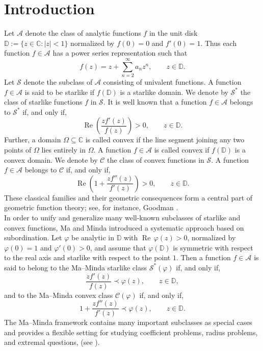 \documentclass[a4paper,12pt,reqno]{amsart} %
\numberwithin{equation}{section}
\theoremstyle{definition}
\newcounter{own}
\begin{document}
\section{Introduction}
Let $\mathcal{A}$ denote the class of analytic functions $f$ in the unit disk
$
\mathbb{D}:=\{z\in\mathbb{C}:|z|<1\}
$
normalized by
$
f(0)=0$ and  $f'(0)=1$.
Thus each function $f\in\mathcal{A}$ has a power series representation such that
\[
f(z)=z+\sum_{n=2}^{\infty}a_n z^n,
\qquad z\in\mathbb{D}.
\]
Let $\mathcal{S}$ denote the subclass of $\mathcal{A}$ consisting of univalent functions.
A function $f\in \mathcal{A}$ is said to be starlike if $f(\mathbb{D})$ is a starlike domain. We denote by $\mathcal{S}^*$ the class of starlike functions $f$ in $\mathcal{S}$. It is well known that a function $f\in \mathcal{A}$ belongs to $\mathcal{S}^*$ if, and only if,
\[
\operatorname{Re}\!\left(\frac{z f'(z)}{f(z)}\right)>0,
\qquad z\in\mathbb{D}.
\]
Further, a domain $\Omega\subseteq \mathbb{C}$ is called convex if the line segment joining any two points of $\Omega$ lies entirely in $\Omega$. A function $f\in \mathcal{A}$ is called convex if $f(\mathbb{D})$ is a convex domain. We denote by $\mathcal{C}$ the class of convex functions in $\mathcal{S}$. A function $f\in \mathcal{A}$ belongs to $\mathcal{C}$ if, and only if,
\[
\operatorname{Re}\!\left(1+\frac{z f''(z)}{f'(z)}\right)>0,
\qquad z\in\mathbb{D}.
\]
These classical families and their geometric consequences form a central part of geometric function theory; see, for instance, Goodman \cite{Goodman1983}.\\[2mm]
In order to unify and generalize many well-known subclasses of starlike and convex functions, Ma and Minda \cite{MaMinda1992} introduced a systematic approach based on subordination. Let $\varphi$ be analytic in $\mathbb{D}$ with $\operatorname{Re}\,\varphi(z)>0$, normalized by $\varphi(0)=1$ and $\varphi'(0)>0$, and assume that $\varphi(\mathbb{D})$ is symmetric with respect to the real axis and starlike with respect to the point $1$. Then a function $f\in\mathcal{A}$ is said to belong to the Ma--Minda starlike class $\mathcal{S}^*(\varphi)$  if, and only if,
\[
\frac{z f'(z)}{f(z)} \prec \varphi(z),
\qquad z\in\mathbb{D},
\]
and to the Ma--Minda convex class $\mathcal{C}(\varphi)$ if, and only if,
\[
1+\frac{z f''(z)}{f'(z)} \prec \varphi(z),
\qquad z\in\mathbb{D}.
\]
The Ma--Minda framework contains many important subclasses as special cases and provides a flexible setting for studying coefficient problems, radius problems, and extremal questions, (see \cite{Janowski1971, MaMinda1992}).\\[2mm]
\end{document}
